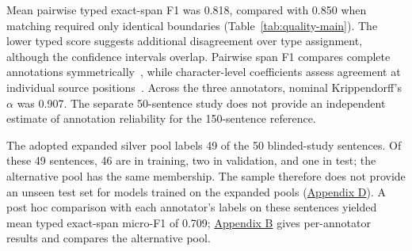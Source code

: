Mean pairwise typed exact-span F1 was 0.818, compared with 0.850 when matching required only identical boundaries (Table~\ref{tab:quality-main}). The lower typed score suggests additional disagreement over type assignment, although the confidence intervals overlap. Pairwise span F1 compares complete annotations symmetrically~\citep{hripcsak2005agreement}, while character-level coefficients assess agreement at individual source positions~\citep{artstein2008agreement}. Across the three annotators, nominal Krippendorff's $\alpha$ was 0.907. The separate 50-sentence study does not provide an independent estimate of annotation reliability for the 150-sentence reference.

The adopted expanded silver pool labels 49 of the 50 blinded-study sentences. Of these 49 sentences, 46 are in training, two in validation, and one in test; the alternative pool has the same membership. The sample therefore does not provide an unseen test set for models trained on the expanded pools (\hyperref[app:d]{Appendix D}). A post hoc comparison with each annotator's labels on these sentences yielded mean typed exact-span micro-F1 of 0.709; \hyperref[app:b]{Appendix B} gives per-annotator results and compares the alternative pool.
